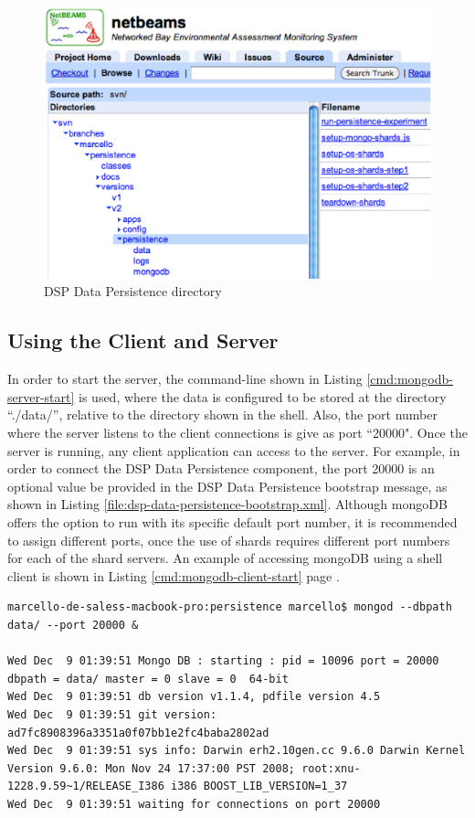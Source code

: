 \begin{figure}[!h]
  \centering
  \includegraphics[scale=0.65]{../diagrams/dsp-persistence-system-dir}
  \caption{DSP Data Persistence directory}
  \label{fig:dsp-persistence-system-dir}
\end{figure}

\subsection{Using the Client and Server}

In order to start the server, the command-line shown in Listing
\ref{cmd:mongodb-server-start} is used, where the data is configured to be
stored at the directory  ``./data/'', relative to the directory shown in the
shell. Also, the port number where the server listens to the client
connections is give as port ``20000". Once the server is running, any client
application can access to the server. For example, in order to connect the DSP
Data Persistence component, the port 20000 is an optional value be provided in
the DSP Data Persistence bootstrap message, as shown in Listing
\ref{file:dsp-data-persistence-bootstrap.xml}. Although mongoDB offers the
option to run with its specific default port number, it is recommended to
assign different ports, once the use of shards requires different port numbers
for each of the shard servers. An example of accessing mongoDB using a shell
client is shown in Listing \ref{cmd:mongodb-client-start} page
\pageref{cmd:mongodb-client-start}.

\lstset{label=cmd:mongodb-server-start,caption=Starting the Server}
\begin{lstlisting}
marcello-de-saless-macbook-pro:persistence marcello$ mongod --dbpath data/ --port 20000 &

Wed Dec  9 01:39:51 Mongo DB : starting : pid = 10096 port = 20000 dbpath = data/ master = 0 slave = 0  64-bit 
Wed Dec  9 01:39:51 db version v1.1.4, pdfile version 4.5
Wed Dec  9 01:39:51 git version: ad7fc8908396a3351a0f07bb1e2fc4baba2802ad
Wed Dec  9 01:39:51 sys info: Darwin erh2.10gen.cc 9.6.0 Darwin Kernel Version 9.6.0: Mon Nov 24 17:37:00 PST 2008; root:xnu-1228.9.59~1/RELEASE_I386 i386 BOOST_LIB_VERSION=1_37
Wed Dec  9 01:39:51 waiting for connections on port 20000
\end{lstlisting}

